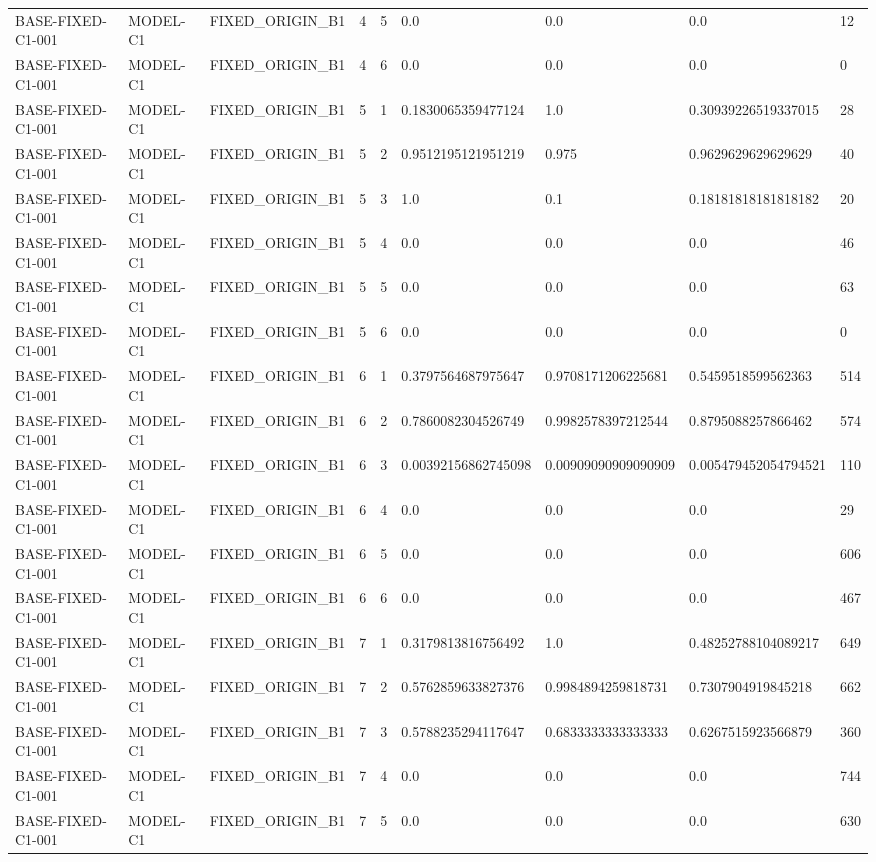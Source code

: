 \begin{tabular}{lllllllll}
BASE-FIXED-C1-001 & MODEL-C1 & FIXED\_ORIGIN\_B1 & 4 & 5 & 0.0 & 0.0 & 0.0 & 12 \\
BASE-FIXED-C1-001 & MODEL-C1 & FIXED\_ORIGIN\_B1 & 4 & 6 & 0.0 & 0.0 & 0.0 & 0 \\
BASE-FIXED-C1-001 & MODEL-C1 & FIXED\_ORIGIN\_B1 & 5 & 1 & 0.1830065359477124 & 1.0 & 0.30939226519337015 & 28 \\
BASE-FIXED-C1-001 & MODEL-C1 & FIXED\_ORIGIN\_B1 & 5 & 2 & 0.9512195121951219 & 0.975 & 0.9629629629629629 & 40 \\
BASE-FIXED-C1-001 & MODEL-C1 & FIXED\_ORIGIN\_B1 & 5 & 3 & 1.0 & 0.1 & 0.18181818181818182 & 20 \\
BASE-FIXED-C1-001 & MODEL-C1 & FIXED\_ORIGIN\_B1 & 5 & 4 & 0.0 & 0.0 & 0.0 & 46 \\
BASE-FIXED-C1-001 & MODEL-C1 & FIXED\_ORIGIN\_B1 & 5 & 5 & 0.0 & 0.0 & 0.0 & 63 \\
BASE-FIXED-C1-001 & MODEL-C1 & FIXED\_ORIGIN\_B1 & 5 & 6 & 0.0 & 0.0 & 0.0 & 0 \\
BASE-FIXED-C1-001 & MODEL-C1 & FIXED\_ORIGIN\_B1 & 6 & 1 & 0.3797564687975647 & 0.9708171206225681 & 0.5459518599562363 & 514 \\
BASE-FIXED-C1-001 & MODEL-C1 & FIXED\_ORIGIN\_B1 & 6 & 2 & 0.7860082304526749 & 0.9982578397212544 & 0.8795088257866462 & 574 \\
BASE-FIXED-C1-001 & MODEL-C1 & FIXED\_ORIGIN\_B1 & 6 & 3 & 0.00392156862745098 & 0.00909090909090909 & 0.005479452054794521 & 110 \\
BASE-FIXED-C1-001 & MODEL-C1 & FIXED\_ORIGIN\_B1 & 6 & 4 & 0.0 & 0.0 & 0.0 & 29 \\
BASE-FIXED-C1-001 & MODEL-C1 & FIXED\_ORIGIN\_B1 & 6 & 5 & 0.0 & 0.0 & 0.0 & 606 \\
BASE-FIXED-C1-001 & MODEL-C1 & FIXED\_ORIGIN\_B1 & 6 & 6 & 0.0 & 0.0 & 0.0 & 467 \\
BASE-FIXED-C1-001 & MODEL-C1 & FIXED\_ORIGIN\_B1 & 7 & 1 & 0.3179813816756492 & 1.0 & 0.48252788104089217 & 649 \\
BASE-FIXED-C1-001 & MODEL-C1 & FIXED\_ORIGIN\_B1 & 7 & 2 & 0.5762859633827376 & 0.9984894259818731 & 0.7307904919845218 & 662 \\
BASE-FIXED-C1-001 & MODEL-C1 & FIXED\_ORIGIN\_B1 & 7 & 3 & 0.5788235294117647 & 0.6833333333333333 & 0.6267515923566879 & 360 \\
BASE-FIXED-C1-001 & MODEL-C1 & FIXED\_ORIGIN\_B1 & 7 & 4 & 0.0 & 0.0 & 0.0 & 744 \\
BASE-FIXED-C1-001 & MODEL-C1 & FIXED\_ORIGIN\_B1 & 7 & 5 & 0.0 & 0.0 & 0.0 & 630 \\

\end{tabular}
